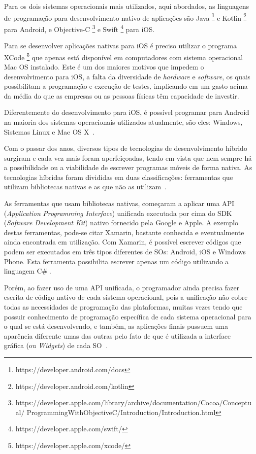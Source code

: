 Para os dois sistemas operacionais mais utilizados, aqui abordados, as linguagens de programação para desenvolvimento nativo de aplicações  são Java \footnote{https://developer.android.com/docs} e Kotlin \footnote{https://developer.android.com/kotlin} para Android, e Objective-C \footnote{https://developer.apple.com/library/archive/documentation/Cocoa/Conceptual/ \newline ProgrammingWithObjectiveC/Introduction/Introduction.html} e Swift \footnote{https://developer.apple.com/swift/} para iOS\@.


Para se desenvolver aplicações nativas para iOS é preciso utilizar o programa XCode \footnote{https://developer.apple.com/xcode/} que apenas está disponível em computadores com sistema operacional Mac OS instalado\cite{goadrich2011smart}.
Este é um dos maiores motivos que impedem o desenvolvimento para iOS, a falta da diversidade de \textit{hardware} e \textit{software}, os quais possibilitam a programação e execução de testes, implicando em um gasto acima da média do que as empresas ou as pessoas físicas têm capacidade de investir.

Diferentemente do desenvolvimento para iOS, é possível programar para Android na maioria dos sistemas operacionais utilizados atualmente, são eles: Windows, Sistemas Linux e Mac OS X~\cite{goadrich2011smart}.


Com o passar dos anos, diversos tipos de tecnologias de desenvolvimento híbrido surgiram e cada vez mais foram aperfeiçoadas, tendo em vista que nem sempre há a possibilidade ou a viabilidade de escrever programas móveis de forma nativa.
As tecnologias híbridas foram divididas em duas classificações: ferramentas que utilizam bibliotecas nativas e as que não as utilizam~\cite{clow2019flutter}.

As ferramentas que usam bibliotecas nativas, começaram a aplicar uma API (\textit{Application Programming Interface}) unificada executada por cima do SDK (\textit{Software Development Kit}) nativo fornecido pela Google e Apple.
A exemplo destas ferramentas, pode-se citar Xamarin, bastante conhecida e eventualmente ainda encontrada em utilização.
Com Xamarin, é possível escrever códigos que podem ser executados em três tipos diferentes de SOs: Android, iOS e Windows Phone.
Esta ferramenta possibilita escrever apenas um código utilizando a linguagem C\# \cite{petzold2015xamarin}.

Porém, ao fazer uso de uma API unificada, o programador ainda precisa fazer escrita de código nativo de cada sistema operacional, pois a unificação não cobre todas as necessidades de programação das plataformas, muitas vezes tendo que possuir conhecimento de programação específica de cada sistema operacional para o qual se está desenvolvendo, e também, as aplicações finais pussuem uma aparência diferente umas das outras pelo fato de que é utilizada a interface gráfica (ou \textit{Widgets}) de cada SO~\cite{clow2019flutter}.

